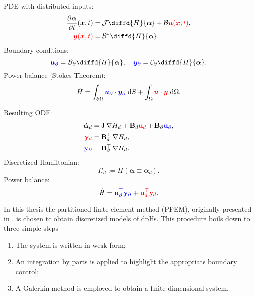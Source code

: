 \begin{tcbraster}[raster columns=2, raster equal height]
	\begin{tcolorbox}[width=0.4\textwidth, nobeforeafter, colframe=theme,title=Infinite dimensional pH system]%
		PDE with distributed inputs:
		\begin{align*}
		\diffp{\bm{\alpha}}{t}(\bm{x}, t) &= \mathcal{J} {\displaystyle \diffd{H}{\bm{\alpha}}}+ \mathcal{B} \textcolor{red}{\bm{u}(\bm{x}, t)}, \\
		\textcolor{red}{\bm{y}(\bm{x}, t)} &= \mathcal{B}^* {\displaystyle \diffd{H}{\bm{\alpha}}}.
		\end{align*}
		Boundary conditions: 
		\[\textcolor{blue}{\bm{u}_\partial} = \mathcal{B}_\partial{\displaystyle \diffd{H}{\bm{\alpha}}}, \quad \textcolor{blue}{\bm{y}_\partial} = \mathcal{C}_\partial {\displaystyle \diffd{H}{\bm{\alpha}}}. \]
		Power balance (Stokes Theorem): 
		\[ \dot{H} = \displaystyle \int_{\partial \Omega} \textcolor{blue}{\bm{u}_\partial} \cdot \textcolor{blue}{\bm{y}_\partial} \d{S} +  \int_{\Omega} \textcolor{red}{\bm{u}} \cdot \textcolor{red}{\bm{y}} \d{\Omega}.
		\]
	\end{tcolorbox} 
	\begin{tcolorbox}[width=0.4\textwidth, nobeforeafter,  colframe=theme,title=Structure-preserving discretization]%
		Resulting ODE:
		\begin{align*}
		\dot{\bm{\alpha}}_d &= \mathbf{J} \, {\nabla {H}_d} + \mathbf{B}_d \textcolor{red}{\mathbf{u}_d} + \mathbf{B}_\partial \textcolor{blue}{\mathbf{u}_\partial}, \\
		\textcolor{red}{\mathbf{y}_d} &= \mathbf{B}_d^\top \, {\nabla {H}_d}, \\
		\textcolor{blue}{\mathbf{y}_\partial} &= \mathbf{B}_\partial^\top \,{\nabla {H}_d}.
		\end{align*}
		Discretized Hamiltonian:
		\[
		H_d := H(\bm{\alpha} \equiv \bm{\alpha}_d).
		\]
		Power balance: 
		\[ \dot{H} = \textcolor{blue}{\mathbf{u}_\partial^\top \mathbf{y}_\partial} +  \textcolor{red}{\mathbf{u}_d^\top \mathbf{y}_d}.
		\]
	\end{tcolorbox}
\end{tcbraster}
\vspace{.5cm}
In this thesis the partitioned finite element method (PFEM), originally presented in \cite{cardoso2018pfem,cardoso2019partitioned}, is chosen to obtain discretized models of dpHs. This procedure boils down to three simple steps
\begin{enumerate}
	\item The system is written in weak form; 
	\item An integration by parts is applied to highlight the appropriate boundary control;
	\item A Galerkin method is employed to obtain a finite-dimensional system.
\end{enumerate}

